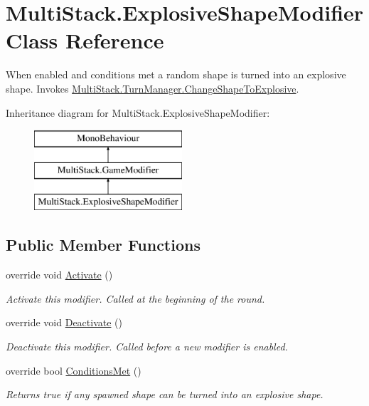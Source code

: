 \hypertarget{class_multi_stack_1_1_explosive_shape_modifier}{}\section{Multi\+Stack.\+Explosive\+Shape\+Modifier Class Reference}
\label{class_multi_stack_1_1_explosive_shape_modifier}


When enabled and conditions met a random shape is turned into an explosive shape. Invokes \hyperlink{class_multi_stack_1_1_turn_manager_a4366a75c5431c6d38c2feeb650f07d54}{Multi\+Stack.\+Turn\+Manager.\+Change\+Shape\+To\+Explosive}.  


Inheritance diagram for Multi\+Stack.\+Explosive\+Shape\+Modifier\+:\begin{figure}[H]
\begin{center}
\leavevmode
\includegraphics[height=3.000000cm]{class_multi_stack_1_1_explosive_shape_modifier}
\end{center}
\end{figure}
\subsection*{Public Member Functions}
\begin{DoxyCompactItemize}
\item 
override void \hyperlink{class_multi_stack_1_1_explosive_shape_modifier_abf979aeccc0665ec513ab62cb908d981}{Activate} ()
\begin{DoxyCompactList}\small\item\em Activate this modifier. Called at the beginning of the round. \end{DoxyCompactList}\item 
override void \hyperlink{class_multi_stack_1_1_explosive_shape_modifier_a48727a773c318122bc369a48079f2f30}{Deactivate} ()
\begin{DoxyCompactList}\small\item\em Deactivate this modifier. Called before a new modifier is enabled. \end{DoxyCompactList}\item 
override bool \hyperlink{class_multi_stack_1_1_explosive_shape_modifier_adaa2309e63d98090bb81527a3d42d04c}{Conditions\+Met} ()
\begin{DoxyCompactList}\small\item\em Returns true if any spawned shape can be turned into an explosive shape. \end{DoxyCompactList}\end{DoxyCompactItemize}
